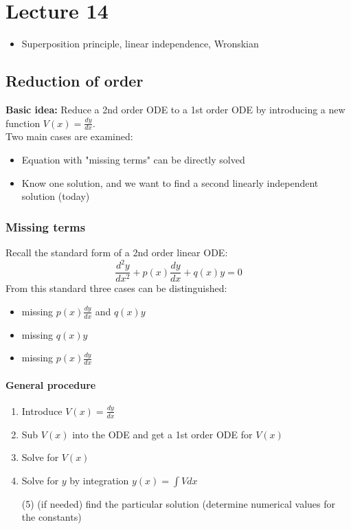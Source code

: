\chapter*{Lecture 14}
\begin{recall}{}{}
\begin{itemize}
\item Superposition principle, linear independence, Wronskian
\end{itemize}
\end{recall}

\section*{ Reduction of order}
\textbf{Basic idea:} Reduce a 2nd order ODE to a 1st order ODE by introducing a new function $V(x)=\frac{dy}{dx}$.\\

Two main cases are examined:
\begin{itemize}
\item Equation with "missing terms" can be directly solved
\item Know one solution, and we want to find a second linearly independent solution (today)
\end{itemize}

\subsection{Missing terms}
Recall the standard form of a 2nd order linear ODE:
\begin{equation*}
\boxed{\frac{d^2y}{dx^2} +p(x)\frac{dy}{dx}+ q(x)y =0}
\end{equation*}
From this standard three cases can be distinguished:
\begin{itemize}
\item missing $p(x)\frac{dy}{dx}$ and $q(x)y$
\item missing $q(x)y$
\item missing $p(x)\frac{dy}{dx}$ 
\end{itemize}

\subsubsection*{General procedure}
\begin{enumerate}
\item Introduce $V(x)=\frac{dy}{dx}$
\item Sub $V(x)$ into the ODE and get a 1st order ODE for $V(x)$
\item Solve for $V(x)$
\item Solve for $y$ by integration $y(x)=\int V dx$
\item[(5)] (if needed) find the particular solution (determine numerical values for the constants)
\end{enumerate}

